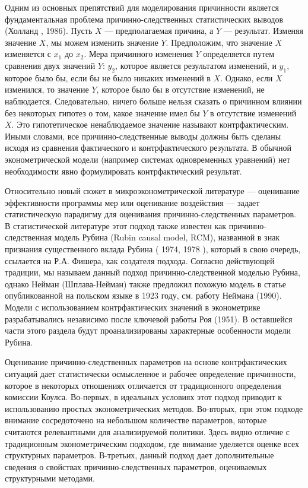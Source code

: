 	
Одним из основных препятствий для моделирования причинности является фундаментальная проблема причинно-следственных статистических выводов (Холланд , 1986). Пусть $X$ --- предполагаемая причина, а $Y$ --- результат. Изменяя значение $X$, мы можем изменить значение $Y$. Предположим, что значение $X$ изменяется с $x_{1}$ до $x_{2}$. Мера причинного  изменения $Y$ определяется путем сравнения двух значений $Y$: $y_{2}$, которое является результатом изменений, и $y_{1}$, которое было бы, если бы не было никаких изменений в $X$. Однако, если $X$ изменился, то значение $Y$, которое было бы в отсутствие изменений, не наблюдается. Следовательно, ничего больше нельзя сказать о причинном влиянии без некоторых гипотез о том, какое значение имел бы $Y$ в отсутствие изменений $X$. Это гипотетическое ненаблюдаемое значение называют контрфактическим. Иными словами, все причинно-следственные  выводы должны быть сделаны исходя из сравнения фактического и контрфактического результата. В обычной эконометрической модели (например системах одновременных уравнений) нет необходимости явно формулировать контрфактический результат.
	
	
Относительно новый сюжет в микроэконометрической литературе --- оценивание эффективности программы мер или оценивание воздействия --- задает статистическую парадигму для оценивания   причинно-следственных параметров. В статистической литературе этот подход также известен как причинно-следственная модель Рубина (Rubin causal model, RCM), названной в знак признания существенного вклада Рубина ( 1974, 1978 ), который  в свою очередь, ссылается на Р.А. Фишера, как создателя подхода. Согласно действующей традиции, мы называем данный подход причинно-следственной моделью Рубина, однако Нейман (Шплава-Нейман) также предложил похожую модель в статье опубликованной на польском языке в 1923 году, см. работу Неймана (1990). Модели с использованием контрфактических значений в эконометрике разрабатывались независимо после ключевой работы Роя (1951).  В оставшейся части этого раздела будут проанализированы характерные особенности модели Рубина. 


Оценивание причинно-следственных параметров на основе контрфактических ситуаций дает  статистически осмысленное и рабочее  определение причинности, которое в некоторых отношениях отличается от традиционного определения комиссии Коулса. Во-первых, в идеальных условиях этот подход приводит к использованию простых эконометрических методов. Во-вторых, при этом подходе внимание сосредоточено на небольшом количестве параметров, которые считаются релевантными для анализируемой политики. Здесь видно отличие с традиционным эконометрическим подходом, где внимание уделяется оценке всех структурных параметров. В-третьих, данный подход дает дополнительные сведения о свойствах причинно-следственных параметров, оцениваемых структурными методами.
	
